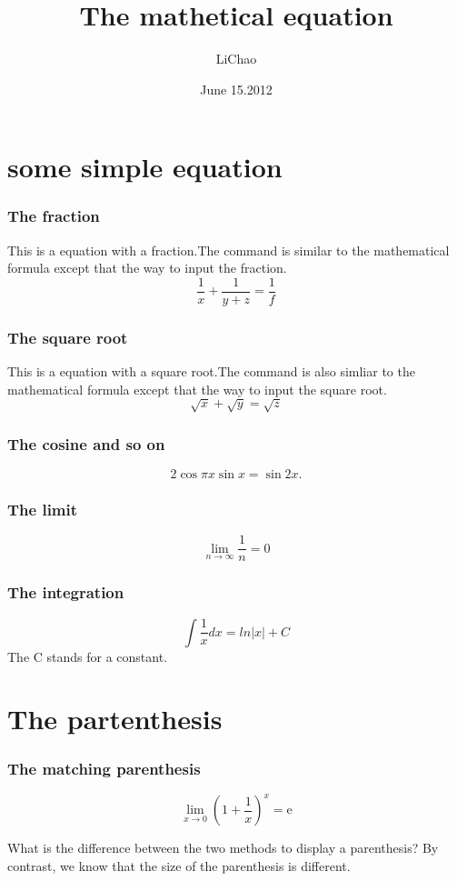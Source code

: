 \documentclass[UTF8]{ctexart}
\title{The mathetical equation}
\author{LiChao}
\date{June 15.2012}
\begin{document}
\maketitle
\part{some simple equation}
\section{The fraction}
This is a equation with a fraction.The command is similar to the mathematical formula except that the way to input the fraction.
\[
  \frac{1}{x}+\frac{1}{y+z}=\frac{1}{f}
\]

\section{The square root}
This is a equation with a square root.The command is also simliar to the mathematical formula except that the way to input the square root.
\[
  \sqrt{x}+\sqrt{y}=\sqrt{z}
\]

\section{The cosine and so on}
\[
  2\cos \pi x\sin x =\sin 2x.
\]

\section{The limit}
\[
  \lim_{n\to\infty}\frac{1}{n}=0
\]

\section{The integration}
\[
  \int \frac{1}{x} dx=ln|x|+C
\]
The C stands for a constant.

\vspace{2cm}
\part{The partenthesis}
\section{The matching parenthesis}
\[
  \lim_{x\to 0}(1+\frac{1}{x})^x=\mathrm{e}
\]

What is the difference between the two methods to display a parenthesis? By contrast, we know that the size of the parenthesis is different.
\end{document}
